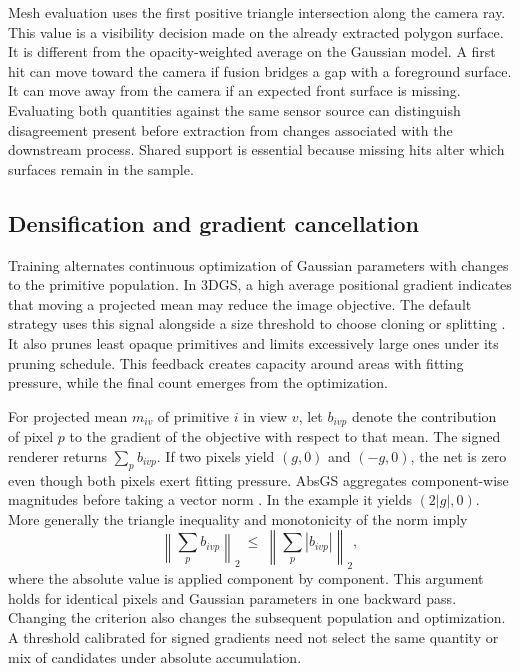 Mesh evaluation uses the first positive triangle intersection along the camera ray. This value is a visibility decision made on the already extracted polygon surface. It is different from the opacity-weighted average on the Gaussian model. A first hit can move toward the camera if fusion bridges a gap with a foreground surface. It can move away from the camera if an expected front surface is missing. Evaluating both quantities against the same sensor source can distinguish disagreement present before extraction from changes associated with the downstream process. Shared support is essential because missing hits alter which surfaces remain in the sample.

\subsection{Densification and gradient cancellation}
Training alternates continuous optimization of Gaussian parameters with changes to the primitive population. In 3DGS, a high average positional gradient indicates that moving a projected mean may reduce the image objective. The default strategy uses this signal alongside a size threshold to choose cloning or splitting \cite{ref4,ref5}. It also prunes least opaque primitives and limits excessively large ones under its pruning schedule. This feedback creates capacity around areas with fitting pressure, while the final count emerges from the optimization.

For projected mean $m_{iv}$ of primitive $i$ in view $v$, let $b_{ivp}$ denote the contribution of pixel $p$ to the gradient of the objective with respect to that mean. The signed renderer returns $\sum_p b_{ivp}$. If two pixels yield $(g,0)$ and $(-g,0)$, the net is zero even though both pixels exert fitting pressure. AbsGS aggregates component-wise magnitudes before taking a vector norm \cite{ref6}. In the example it yields $(2|g|,0)$. More generally the triangle inequality and monotonicity of the norm imply
\begin{equation}
 \left\|\sum_p b_{ivp}\right\|_2
  \ \leq\ \left\| \sum_p |b_{ivp}| \right\|_2 ,
\end{equation}
where the absolute value is applied component by component. This argument holds for identical pixels and Gaussian parameters in one backward pass. Changing the criterion also changes the subsequent population and optimization. A threshold calibrated for signed gradients need not select the same quantity or mix of candidates under absolute accumulation.

